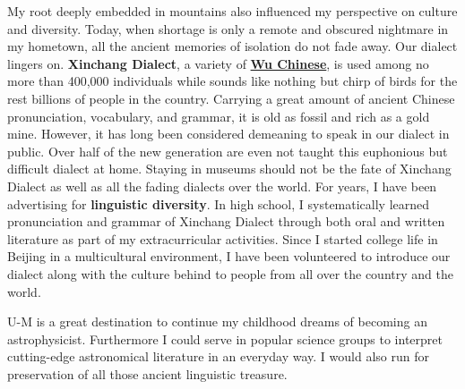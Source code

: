 \documentclass[11pt, a4paper]{awesome-cv} %
\begin{document}
\begin{cvletter}
My root deeply embedded in mountains also influenced my perspective on culture and diversity. Today, when shortage is only a remote and obscured nightmare in my hometown, all the ancient memories of isolation do not fade away. Our dialect lingers on. \textbf{Xinchang Dialect}, a variety of \href{https://en.wikipedia.org/wiki/Wu_Chinese}{\textbf{Wu Chinese}}, is used among no more than 400,000 individuals while sounds like nothing but chirp of birds for the rest billions of people in the country. Carrying a great amount of ancient Chinese pronunciation, vocabulary, and grammar, it is old as fossil and rich as a gold mine. However, it has long been considered demeaning to speak in our dialect in public. Over half of the new generation are even not taught this euphonious but difficult dialect at home. Staying in museums should not be the fate of Xinchang Dialect as well as all the fading dialects over the world. For years, I have been advertising for \textbf{linguistic diversity}. In high school, I systematically learned pronunciation and grammar of Xinchang Dialect through both oral and written literature as part of my extracurricular activities. Since I started college life in Beijing in a multicultural environment, I have been volunteered to introduce our dialect along with the culture behind to people from all over the country and the world. 

U-M is a great destination to continue my childhood dreams of becoming an astrophysicist. Furthermore I could serve in popular science groups to interpret cutting-edge astronomical literature in an everyday way. I would also run for preservation of all those ancient linguistic treasure.

\end{cvletter}


\end{document}
